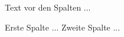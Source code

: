 Text vor den Spalten ...
\begin{cols}
  Erste Spalte ...
  \colbreak
  Zweite Spalte ...
\end{cols}

